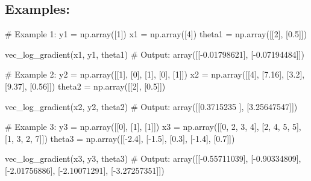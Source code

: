 \documentclass[]{article}
\newenvironment{Shaded}{\begin{snugshade}}{\end{snugshade}}
\newcommand{\CommentTok}[1]{\textcolor[rgb]{0.48,0.49,0.49}{#1}}
\newcommand{\DecValTok}[1]{\textcolor[rgb]{0.96,0.45,0.00}{#1}}
\newcommand{\FloatTok}[1]{\textcolor[rgb]{0.96,0.45,0.00}{#1}}
\newcommand{\NormalTok}[1]{\textcolor[rgb]{0.81,0.81,0.76}{#1}}
\newcommand{\OperatorTok}[1]{\textcolor[rgb]{0.81,0.81,0.76}{#1}}
\begin{document}
\hypertarget{examples-7}{%
\subsection{Examples:}\label{examples-7}}

\begin{Shaded}
\begin{Highlighting}[]
\CommentTok{# Example 1:}
\NormalTok{y1 }\OperatorTok{=}\NormalTok{ np.array([}\DecValTok{1}\NormalTok{])}
\NormalTok{x1 }\OperatorTok{=}\NormalTok{ np.array([}\DecValTok{4}\NormalTok{])}
\NormalTok{theta1 }\OperatorTok{=}\NormalTok{ np.array([[}\DecValTok{2}\NormalTok{], [}\FloatTok{0.5}\NormalTok{]])}

\NormalTok{vec_log_gradient(x1, y1, theta1)}
\CommentTok{# Output:}
\NormalTok{array([[}\OperatorTok{-}\FloatTok{0.01798621}\NormalTok{],}
\NormalTok{       [}\OperatorTok{-}\FloatTok{0.07194484}\NormalTok{]])}

\CommentTok{# Example 2: }
\NormalTok{y2 }\OperatorTok{=}\NormalTok{ np.array([[}\DecValTok{1}\NormalTok{], [}\DecValTok{0}\NormalTok{], [}\DecValTok{1}\NormalTok{], [}\DecValTok{0}\NormalTok{], [}\DecValTok{1}\NormalTok{]])}
\NormalTok{x2 }\OperatorTok{=}\NormalTok{ np.array([[}\DecValTok{4}\NormalTok{], [}\FloatTok{7.16}\NormalTok{], [}\FloatTok{3.2}\NormalTok{], [}\FloatTok{9.37}\NormalTok{], [}\FloatTok{0.56}\NormalTok{]])}
\NormalTok{theta2 }\OperatorTok{=}\NormalTok{ np.array([[}\DecValTok{2}\NormalTok{], [}\FloatTok{0.5}\NormalTok{]])}

\NormalTok{vec_log_gradient(x2, y2, theta2)}
\CommentTok{# Output:}
\NormalTok{array([[}\FloatTok{0.3715235}\NormalTok{ ],}
\NormalTok{       [}\FloatTok{3.25647547}\NormalTok{]])}

\CommentTok{# Example 3: }
\NormalTok{y3 }\OperatorTok{=}\NormalTok{ np.array([[}\DecValTok{0}\NormalTok{], [}\DecValTok{1}\NormalTok{], [}\DecValTok{1}\NormalTok{]])}
\NormalTok{x3 }\OperatorTok{=}\NormalTok{ np.array([[}\DecValTok{0}\NormalTok{, }\DecValTok{2}\NormalTok{, }\DecValTok{3}\NormalTok{, }\DecValTok{4}\NormalTok{], [}\DecValTok{2}\NormalTok{, }\DecValTok{4}\NormalTok{, }\DecValTok{5}\NormalTok{, }\DecValTok{5}\NormalTok{], [}\DecValTok{1}\NormalTok{, }\DecValTok{3}\NormalTok{, }\DecValTok{2}\NormalTok{, }\DecValTok{7}\NormalTok{]])}
\NormalTok{theta3 }\OperatorTok{=}\NormalTok{ np.array([[}\OperatorTok{-}\FloatTok{2.4}\NormalTok{], [}\OperatorTok{-}\FloatTok{1.5}\NormalTok{], [}\FloatTok{0.3}\NormalTok{], [}\OperatorTok{-}\FloatTok{1.4}\NormalTok{], [}\FloatTok{0.7}\NormalTok{]])}

\NormalTok{vec_log_gradient(x3, y3, theta3)}
\CommentTok{# Output:}
\NormalTok{array([[}\OperatorTok{-}\FloatTok{0.55711039}\NormalTok{],}
\NormalTok{       [}\OperatorTok{-}\FloatTok{0.90334809}\NormalTok{],}
\NormalTok{       [}\OperatorTok{-}\FloatTok{2.01756886}\NormalTok{],}
\NormalTok{       [}\OperatorTok{-}\FloatTok{2.10071291}\NormalTok{],}
\NormalTok{       [}\OperatorTok{-}\FloatTok{3.27257351}\NormalTok{]])}
\end{Highlighting}
\end{Shaded}
\end{document}
